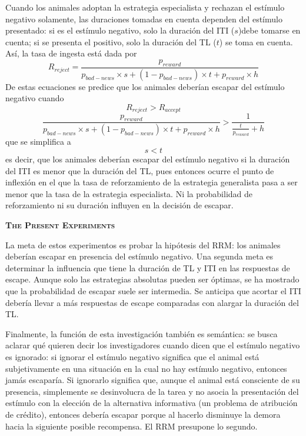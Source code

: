 \documentclass[a4paper,12pt]{article}
\begin{document}
Cuando los animales adoptan la estrategia especialista y rechazan el estímulo negativo solamente, las duraciones tomadas en cuenta dependen del estímulo presentado: si es el estímulo negativo, solo la duración del ITI ($s$)debe tomarse en cuenta; si se presenta el positivo, solo la duración del TL ($t$) se toma en cuenta. Así, la tasa de ingesta está dada por
$$
R_{reject}=\frac{p_{reward}}{p_{bad-news}\times s + (1-p_{bad-news}) \times t + p_{reward}\times h}
$$
De estas ecuaciones se predice que los animales deberían escapar del estímulo negativo cuando 
$$
R_{reject} > R_{accept}
$$
$$
\frac{p_{reward}}{p_{bad-news}\times s + (1-p_{bad-news}) \times t + p_{reward}\times h}>\frac{1}{\frac{t}{p_{reward}}+h}
$$
que se simplifica a
$$ s <t $$
es decir, que los animales deberían escapar del estímulo negativo si la duración del ITI es menor que la duración del TL, pues entonces ocurre el punto de inflexión en el que la tasa de reforzamiento de la estrategia generalista pasa a ser menor que la tasa de la estrategia especialista. Ni la probabilidad de reforzamiento ni su duración influyen en la decisión de escapar.

{\scshape\bfseries The Present Experiments}

La meta de estos experimentos es probar la hipótesis del RRM: los animales deberían escapar en presencia del estímulo negativo. Una segunda meta es determinar la influencia que tiene la duración de TL y ITI en las respuestas de escape. Aunque solo las estrategias absolutas pueden ser óptimas, se ha mostrado que la probabilidad de escapar suele ser intermedia. Se anticipa que acortar el ITI debería llevar a más respuestas de escape comparadas con alargar la duración del TL.

Finalmente, la función de esta investigación también es semántica: se busca aclarar qué quieren decir los investigadores cuando dicen que el estímulo negativo es ignorado: si ignorar el estímulo negativo significa que el animal está subjetivamente en una situación en la cual no hay estímulo negativo, entonces jamás escaparía. Si ignorarlo significa que, aunque el animal está consciente de su presencia, simplemente se desinvolucra de la tarea y no asocia la presentación del estímulo con la elección de la alternativa informativa (un problema de atribución de crédito), entonces debería escapar porque al hacerlo disminuye la demora hacia la siguiente posible recompensa. El RRM presupone lo segundo.
\end{document}
